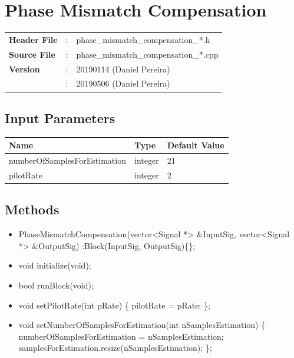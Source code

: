 \clearpage

\section{Phase Mismatch Compensation}
\label{sec:phase_mismatch_compensation}
\begin{refsection}

\begin{tcolorbox}	
\begin{tabular}{p{2.75cm} p{0.2cm} p{10.5cm}} 	
\textbf{Header File}    &:& phase\_mismatch\_compensation\_*.h \\
\textbf{Source File}    &:& phase\_mismatch\_compensation\_*.cpp \\
\textbf{Version}        &:& 20190114 (Daniel Pereira)\\
						&:& 20190506 (Daniel Pereira)
\end{tabular}
\end{tcolorbox}

\subsection*{Input Parameters}

\begin{table}[H]
\centering
\begin{tabular}{|l|l|l|}
\hline
Name                         & Type           & Default Value \\ \hline
numberOfSamplesForEstimation & integer        & 21            \\ \hline
pilotRate                    & integer        & 2             \\ \hline
\end{tabular}
\end{table}


\subsection*{Methods}

\begin{itemize}
  \item PhaseMismatchCompensation(vector<Signal *> \&InputSig, vector<Signal *> \&OutputSig) :Block(InputSig, OutputSig)\{\};
  \item void initialize(void);
  \item bool runBlock(void);
  \item void setPilotRate(int pRate) \{ pilotRate = pRate; \};
  \item void setNumberOfSamplesForEstimation(int nSamplesEstimation) \{ numberOfSamplesForEstimation = nSamplesEstimation; samplesForEstimation.resize(nSamplesEstimation); \};
\end{itemize}





\end{refsection}
